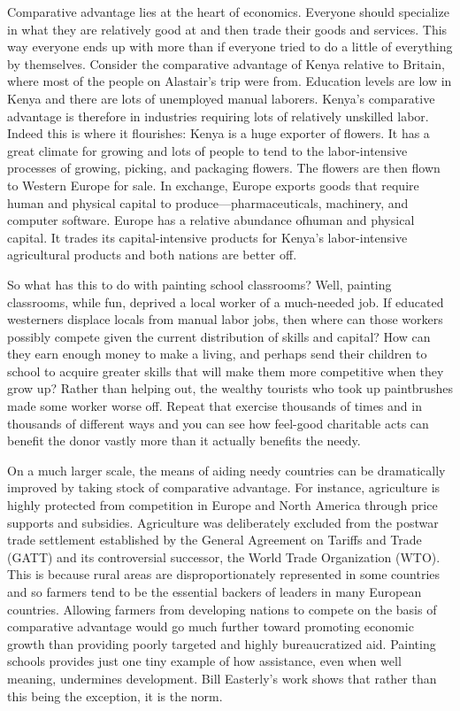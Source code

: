 \documentclass[10pt]{article}
\begin{document}
{\large Comparative advantage lies at the heart of economics. Everyone should
specialize in what they are relatively good at and then trade their goods and
services. This way everyone ends up with more than if everyone tried to do a
little of everything by themselves. Consider the comparative advantage of Kenya
relative to Britain, where most of the people on Alastair's trip were from.
Education levels are low in Kenya and there are lots of unemployed manual
laborers. Kenya's comparative advantage is therefore in industries requiring lots
of relatively unskilled labor. Indeed this is where it flourishes: Kenya is a
huge exporter of flowers. It has a great climate for growing and lots of people
to tend to the labor-intensive processes of growing, picking, and packaging
flowers. The flowers are then flown to Western Europe for sale. In exchange,
Europe exports goods that require human and physical capital to
produce---pharmaceuticals, machinery, and computer software. Europe has a
relative abundance ofhuman and physical capital. It trades its capital-intensive
products for Kenya's labor-intensive agricultural products and both nations are
better off.}

{\large So what has this to do with painting school classrooms? Well, painting
classrooms, while fun, deprived a local worker of a much-needed job. If educated
westerners displace locals from manual labor jobs, then where can those workers
possibly compete given the current distribution of skills and capital? How can
they earn enough money to make a living, and perhaps send their children to
school to acquire greater skills that will make them more competitive when they
grow up? Rather than helping out, the wealthy tourists who took up paintbrushes
made some worker worse off. Repeat that exercise thousands of times and in
thousands of different ways and you can see how feel-good charitable acts can
benefit the donor vastly more than it actually benefits the needy.}

{\large On a much larger scale, the means of aiding needy countries can be
dramatically improved by taking stock of comparative advantage. For instance,
agriculture is highly protected from competition in Europe and North America
through price supports and subsidies. Agriculture was deliberately excluded from
the postwar trade settlement established by the General Agreement on Tariffs and
Trade (GATT) and its controversial successor, the World Trade Organization (WTO).
This is because rural areas are disproportionately represented in some countries
and so farmers tend to be the essential backers of leaders in many European
countries. Allowing farmers from developing nations to compete on the basis of
comparative advantage would go much further toward promoting economic growth than
providing poorly targeted and highly bureaucratized aid. Painting schools
provides just one tiny example of how assistance, even when well meaning,
undermines development. Bill Easterly's work shows that rather than this being
the exception, it is the norm.}
\end{document}
